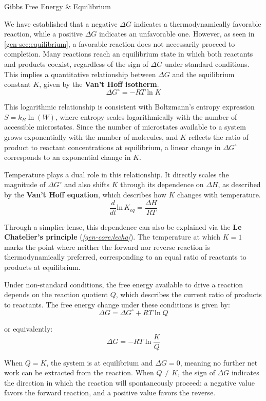 \documentclass[10pt]{article}
\begin{document}
    \begin{core}[label=core:G_eq]{Gibbs Free Energy \& Equilibrium}

      We have established that a negative $\Delta G$ indicates a thermodynamically favorable reaction, while a positive $\Delta G$ indicates an unfavorable one. However, as seen in \autoref{gen-sec:equilibrium}, a favorable reaction does not necessarily proceed to completion. Many reactions reach an equilibrium state in which both reactants and products coexist, regardless of the sign of $\Delta G$ under standard conditions. This implies a quantitative relationship between $\Delta G$ and the equilibrium constant $K$, given by the \textbf{Van't Hoff isotherm}.
      \[
        \Delta G^{\circ} = -RT\ln{K}
      \]

      This logarithmic relationship is consistent with Boltzmann's entropy expression $S = k_B \ln(W)$, where entropy scales logarithmically with the number of accessible microstates. Since the number of microstates available to a system grows exponentially with the number of molecules, and $K$ reflects the ratio of product to reactant concentrations at equilibrium, a linear change in $\Delta G^{\circ}$ corresponds to an exponential change in $K$.

      Temperature plays a dual role in this relationship. It directly scales the magnitude of $\Delta G^{\circ}$ and also shifts $K$ through its dependence on $\Delta H$, as described by the \textbf{Van't Hoff equation}, which describes how $K$ changes with temperature.
      \[
        \frac{d}{dt}\text{ln}\,K_{eq} = \frac{ΔH}{RT}
      \]

      Through a simplier lense, this dependence can also be explained via the \textbf{Le Chatelier's principle} (\textit{\autoref{gen-core:lecha}}). The temperature at which $K = 1$ marks the point where neither the forward nor reverse reaction is thermodynamically preferred, corresponding to an equal ratio of reactants to products at equilibrium.

      Under non-standard conditions, the free energy available to drive a reaction depends on the reaction quotient $Q$, which describes the current ratio of products to reactants. The free energy change under these conditions is given by:
      \[
        \Delta G = \Delta G^{\circ} + RT\ln{Q}
      \]

      or equivalently:
      \[
        \Delta G = -RT\ln{\frac{K}{Q}}
      \]

      When $Q = K$, the system is at equilibrium and $\Delta G = 0$, meaning no further net work can be extracted from the reaction. When $Q \neq K$, the sign of $\Delta G$ indicates the direction in which the reaction will spontaneously proceed: a negative value favors the forward reaction, and a positive value favors the reverse.

    \end{core}
\end{document}
